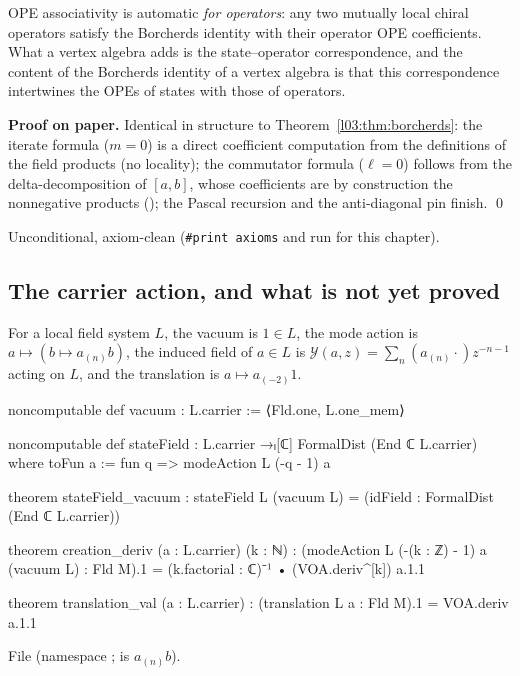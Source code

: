 \begin{physics}
OPE associativity is automatic \emph{for operators}: any two mutually local chiral operators satisfy
the Borcherds identity with their operator OPE coefficients. What a vertex algebra adds is the
state--operator correspondence, and the content of the Borcherds identity of a vertex algebra is that
this correspondence intertwines the OPEs of states with those of operators.
\end{physics}

\textbf{Proof on paper.} Identical in structure to Theorem~\ref{l03:thm:borcherds}: the iterate formula
($m=0$) is a direct coefficient computation from the definitions of the field products (no locality);
the commutator formula ($\ell = 0$) follows from the delta-decomposition of $[a,b]$, whose coefficients
are by construction the nonnegative products (); the Pascal
recursion and the anti-diagonal pin finish. \qed

\begin{status}
Unconditional, axiom-clean (\texttt{\#print axioms}  and
 run for this chapter).
\end{status}

\subsection{The carrier action, and what is not yet proved}

\begin{definition}\label{l03:def:statefield}
For a local field system $L$, the vacuum is $1\in L$, the mode action is $a\mapsto(b\mapsto a_{(n)}b)$,
the induced field of $a\in L$ is $\mathcal Y(a,z) = \sum_n(a_{(n)}\cdot)z^{-n-1}$ acting on $L$, and the
translation is $a\mapsto a_{(-2)}1$.
\end{definition}
\begin{leancode}
noncomputable def vacuum : L.carrier := ⟨Fld.one, L.one_mem⟩

noncomputable def stateField : L.carrier →ₗ[ℂ] FormalDist (End ℂ L.carrier) where
  toFun a := fun q => modeAction L (-q - 1) a

theorem stateField_vacuum :
    stateField L (vacuum L) = (idField : FormalDist (End ℂ L.carrier))

theorem creation_deriv (a : L.carrier) (k : ℕ) :
    (modeAction L (-(k : ℤ) - 1) a (vacuum L) : Fld M).1 =
      (k.factorial : ℂ)⁻¹ • (VOA.deriv^[k]) a.1.1

theorem translation_val (a : L.carrier) :
    (translation L a : Fld M).1 = VOA.deriv a.1.1
\end{leancode}
File  (namespace
;  is $a_{(n)}b$).

